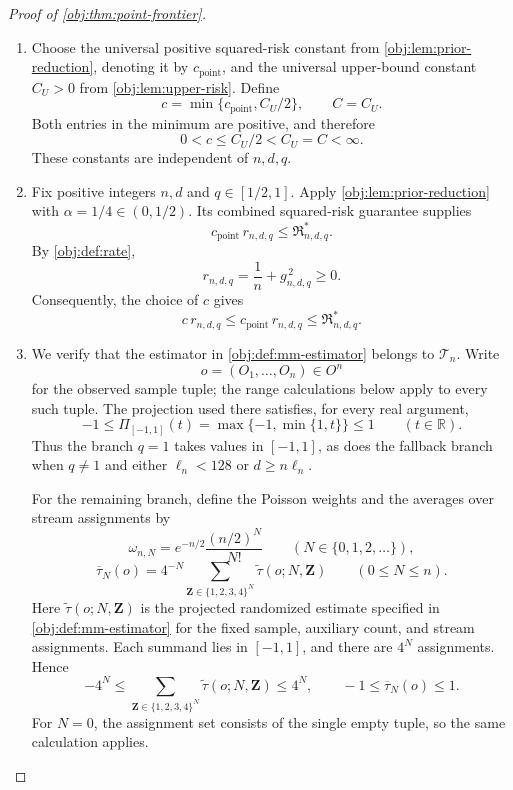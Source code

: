 \begin{proof}[Proof of \cref{obj:thm:point-frontier}]
\begin{enumerate}
\item Choose the universal positive squared-risk constant from \cref{obj:lem:prior-reduction}, denoting it by \(c_{\mathrm{point}}\), and the universal upper-bound constant \(C_U>0\) from \cref{obj:lem:upper-risk}. Define
\[
c=\min\{c_{\mathrm{point}},C_U/2\},
\qquad C=C_U.
\]
Both entries in the minimum are positive, and therefore
\[
0<c\le C_U/2<C_U=C<\infty.
\]
These constants are independent of \(n,d,q\).

\item Fix positive integers \(n,d\) and \(q\in[1/2,1]\). Apply \cref{obj:lem:prior-reduction} with \(\alpha=1/4\in(0,1/2)\). Its combined squared-risk guarantee supplies
\[
c_{\mathrm{point}}\,r_{n,d,q}
\le \mathfrak R^*_{n,d,q}.
\]
By \cref{obj:def:rate},
\[
r_{n,d,q}=\frac1n+g_{n,d,q}^{\,2}\ge0.
\]
Consequently, the choice of \(c\) gives
\[
c\,r_{n,d,q}
\le c_{\mathrm{point}}\,r_{n,d,q}
\le \mathfrak R^*_{n,d,q}.
\]

\item We verify that the estimator in \cref{obj:def:mm-estimator} belongs to \(\mathcal T_n\). Write
\[
o=(O_1,\ldots,O_n)\in O^n
\]
for the observed sample tuple; the range calculations below apply to every such tuple. The projection used there satisfies, for every real argument,
\[
-1\le \Pi_{[-1,1]}(t)
=\max\{-1,\min\{1,t\}\}\le1
\qquad(t\in\mathbb R).
\]
Thus the branch \(q=1\) takes values in \([-1,1]\), as does the fallback branch when \(q\ne1\) and either \(\ell_n<128\) or \(d\ge n\ell_n\).

For the remaining branch, define the Poisson weights and the averages over stream assignments by
\[
\omega_{n,N}
=e^{-n/2}\frac{(n/2)^N}{N!}
\qquad(N\in\{0,1,2,\ldots\}),
\]
\[
\overline\tau_N(o)
=4^{-N}
\sum_{\mathbf Z\in\{1,2,3,4\}^{N}}
\widetilde\tau(o;N,\mathbf Z)
\qquad(0\le N\le n).
\]
Here \(\widetilde\tau(o;N,\mathbf Z)\) is the projected randomized estimate specified in \cref{obj:def:mm-estimator} for the fixed sample, auxiliary count, and stream assignments. Each summand lies in \([-1,1]\), and there are \(4^N\) assignments. Hence
\[
-4^N
\le
\sum_{\mathbf Z\in\{1,2,3,4\}^{N}}
\widetilde\tau(o;N,\mathbf Z)
\le4^N,
\qquad
-1\le\overline\tau_N(o)\le1.
\]
For \(N=0\), the assignment set consists of the single empty tuple, so the same calculation applies.


\end{enumerate}
\end{proof}
